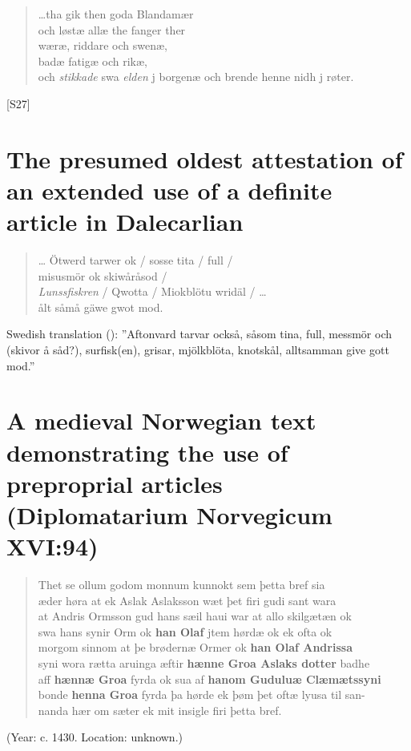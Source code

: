 \begin{quotation}

 
…tha gik then goda Blandamær\\
och løstæ allæ the fanger ther\\
wæræ, riddare och swenæ,\\
badæ fatigæ och rikæ,\\
och \textit{stikkade} swa \textit{elden} j borgenæ och brende henne nidh j røter.

\end{quotation}
[S27]

\section{The presumed oldest attestation of an extended use of a definite article in Dalecarlian}

\begin{quotation} 
… Ötwerd tarwer ok / sosse tita / full /\\
misusmör ok skiwåråsod / \\
\textit{Lunssfiskren} / Qwotta / Miokblötu wridäl / …\\
ålt såmå gäwe gwot mod.%
\\
\end{quotation}
 

Swedish translation (\citet[166]{Björklund1994}): ”Aftonvard tarvar också, såsom tina, full, messmör och (skivor å såd?), surfisk(en), grisar, mjölkblöta, knotskål, alltsamman give gott mod.”

\section{A medieval Norwegian text demonstrating the use of preproprial articles (Diplomatarium Norvegicum XVI:94)}

\begin{quotation} 

Thet se ollum godom monnum kunnokt sem þetta bref sia\\
æder høra at ek Aslak Aslaksson wæt þet firi gudi sant wara\\
at Andris Ormsson gud hans sæil haui war at allo skilgætæn ok\\
swa hans synir Orm ok \textbf{han Olaf} jtem hørdæ ok ek ofta ok\\
morgom sinnom at þe brødernæ Ormer ok \textbf{han Olaf Andrissa}\\
syni wora rætta aruinga æftir \textbf{hænne Groa Aslaks dotter} badhe\\
aff \textbf{hænnæ Groa} fyrda ok sua af \textbf{hanom Guduluæ Clæmætssyni}\\
bonde \textbf{henna Groa} fyrda þa hørde ek þøm þet oftæ lyusa til san-\\
nanda hær om sæter ek mit insigle firi þetta bref.
\end{quotation}

 (Year: c. 1430. Location: unknown.)
